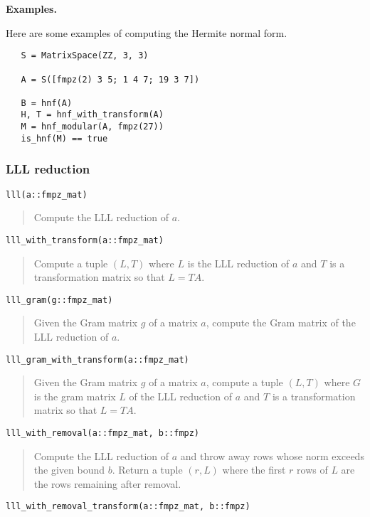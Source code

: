 \documentclass[a4paper,10pt]{article}
\newcommand{\desc}[1]{\vspace{-3mm}\begin{quote}#1\end{quote}}
\begin{document}
{{\textbf{Examples.}

Here are some examples of computing the Hermite normal form.

\begin{lstlisting}
   S = MatrixSpace(ZZ, 3, 3)

   A = S([fmpz(2) 3 5; 1 4 7; 19 3 7])
   
   B = hnf(A)
   H, T = hnf_with_transform(A)
   M = hnf_modular(A, fmpz(27))
   is_hnf(M) == true
\end{lstlisting}

\subsubsection{LLL reduction}

\begin{lstlisting}
lll(a::fmpz_mat)
\end{lstlisting}

\desc{Compute the LLL reduction of $a$.}

\begin{lstlisting}
lll_with_transform(a::fmpz_mat)
\end{lstlisting}

\desc{Compute a tuple $(L, T)$ where $L$ is the LLL reduction of $a$
and $T$ is a transformation matrix so that $L = TA$.}

\begin{lstlisting}
lll_gram(g::fmpz_mat)
\end{lstlisting}

\desc{Given the Gram matrix $g$ of a matrix $a$, compute the Gram matrix of
the LLL reduction of $a$.}

\begin{lstlisting}
lll_gram_with_transform(a::fmpz_mat)
\end{lstlisting}

\desc{Given the Gram matrix $g$ of a matrix $a$, compute a tuple $(L, T)$ where
$G$ is the gram matrix $L$ of the LLL reduction of $a$ and $T$ is a transformation
matrix so that $L = TA$.}

\begin{lstlisting}
lll_with_removal(a::fmpz_mat, b::fmpz)
\end{lstlisting}

\desc{Compute the LLL reduction of $a$ and throw away rows whose norm exceeds
the given bound $b$. Return a tuple $(r, L)$ where the first $r$ rows of $L$
are the rows remaining after removal.}

\begin{lstlisting}
lll_with_removal_transform(a::fmpz_mat, b::fmpz)
\end{lstlisting}

}}
\end{document}
